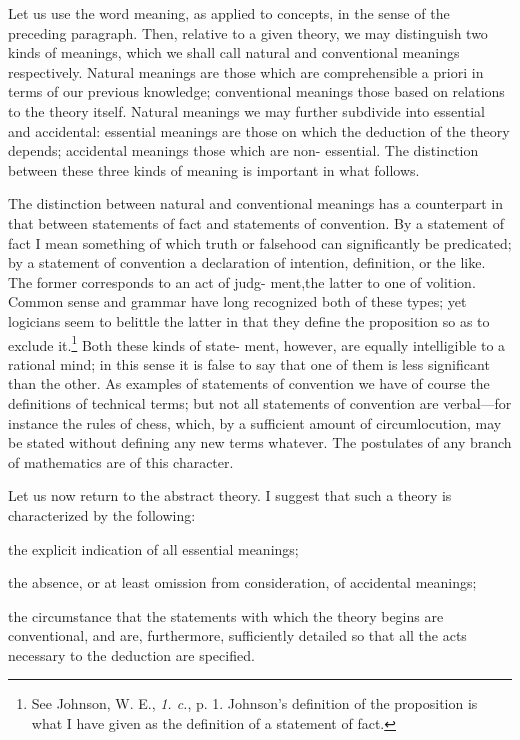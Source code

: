 \documentclass[10pt, twoside]{extarticle}
\theoremstyle{breaktheorem}
\theoremstyle{mylemma}
\theoremstyle{mydefinition}
\theoremstyle{mycorollary}
\begin{document}
Let us use the word meaning, as applied to concepts, in the sense of the
preceding paragraph. Then, relative to a given theory, we may distinguish
two kinds of meanings, which we shall call natural and conventional meanings
respectively. Natural meanings are those which are comprehensible a priori
in terms of our previous knowledge; conventional meanings those based on
relations to the theory itself. Natural meanings we may further subdivide
into essential and accidental: essential meanings are those on which the
deduction of the theory depends; accidental meanings those which are non-
essential. The distinction between these three kinds of meaning is important
in what follows.

The distinction between natural and conventional meanings has a
counterpart in that between statements of fact and statements of convention.
By a statement of fact I mean something of which truth or falsehood can
significantly be predicated; by a statement of convention a declaration of
intention, definition, or the like. The former corresponds to an act of judg-
ment,the latter to one of volition. Common sense and grammar have long
recognized both of these types; yet logicians seem to belittle the latter in that they define the proposition so as to exclude it.\footnote{See Johnson, W. E., \textit{1. c.}, p. 1. Johnson's definition of the proposition is what I have given as the definition of a statement of fact.} Both these kinds of state-
ment, however, are equally intelligible to a rational mind; in this sense it is
false to say that one of them is less significant than the other. As examples
of statements of convention we have of course the definitions of technical
terms; but not all statements of convention are verbal---for instance the rules
of chess, which, by a sufficient amount of circumlocution, may be stated
without defining any new terms whatever. The postulates of any branch of
mathematics are of this character.

Let us now return to the abstract theory. I suggest that such a theory
is characterized by the following: \begin{enumerate*}[label=\arabic*)] \item the explicit indication of all essential
meanings; \item the absence, or at least omission from consideration, of
accidental meanings; \item the circumstance that the statements with which
the theory begins are conventional, and are, furthermore, sufficiently detailed
so that all the acts necessary to the deduction are specified.
\end{enumerate*}
\end{document}
